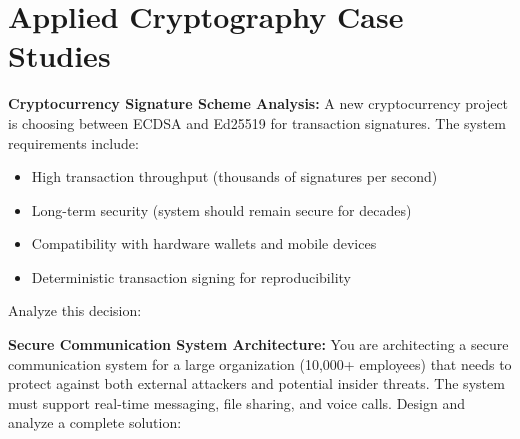 \documentclass[10pt,a4paper,american]{exam}
\begin{document}
\section{Applied Cryptography Case Studies}
\begin{questions}
	\question[15] \textbf{Cryptocurrency Signature Scheme Analysis:}
	A new cryptocurrency project is choosing between ECDSA and Ed25519 for transaction signatures. The system requirements include:
	\begin{itemize}
		\item High transaction throughput (thousands of signatures per second)
		\item Long-term security (system should remain secure for decades)
		\item Compatibility with hardware wallets and mobile devices
		\item Deterministic transaction signing for reproducibility
	\end{itemize}
	Analyze this decision:

	\question[15] \textbf{Secure Communication System Architecture:}
	You are architecting a secure communication system for a large organization (10,000+ employees) that needs to protect against both external attackers and potential insider threats. The system must support real-time messaging, file sharing, and voice calls.
	Design and analyze a complete solution:
\end{questions}
\end{document}
